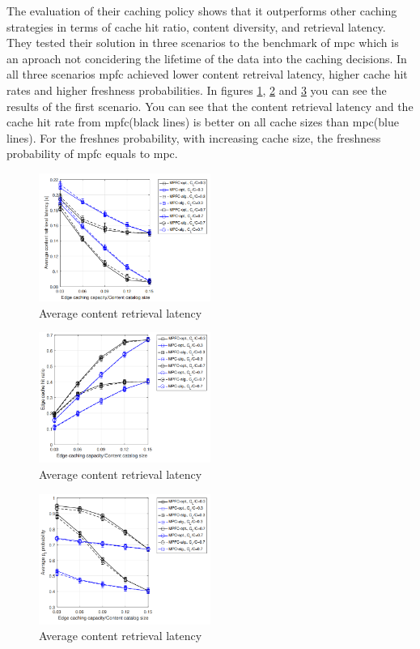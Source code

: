 \documentclass[conference]{IEEEtran}
\begin{document}
	The evaluation of their caching policy shows that it outperforms other caching strategies in terms of cache hit ratio, content diversity, and retrieval latency. They tested their solution in three scenarios to the benchmark of \ac{mpc} which is an aproach not concidering the lifetime of the data into the caching decisions.
	In all three scenarios \ac{mpfc} achieved lower content retreival latency, higher cache hit rates and higher freshness probabilities.
	In figures \ref{fig:lifetime-latency}, \ref{fig:lifetime-hitrate} and \ref{fig:lifetime-freshness} you can see the results of the first scenario. You can see that the content retrieval latency and the cache hit rate from \ac{mpfc}(black lines) is better on all cache sizes than \ac{mpc}(blue lines). For the freshnes probability, with increasing cache size, the freshness probability of \ac{mpfc} equals to \ac{mpc}.

	\begin{figure}
		\label{fig:lifetime-latency}
		\centering
		\includegraphics[width=0.5\textwidth]{figures/fresh-latency.png}
		\caption{Average content retrieval latency \cite{caching-2}}
	\end{figure}
	\begin{figure}
		\label{fig:lifetime-hitrate}
		\centering
		\includegraphics[width=0.5\textwidth]{figures/fresh-hitrate.png}
		\caption{Average content retrieval latency \cite{caching-2}}
	\end{figure}
	\begin{figure}
		\label{fig:lifetime-freshness}
		\centering
		\includegraphics[width=0.5\textwidth]{figures/fresh-freshness.png}
		\caption{Average content retrieval latency \cite{caching-2}}
	\end{figure}
\end{document}
